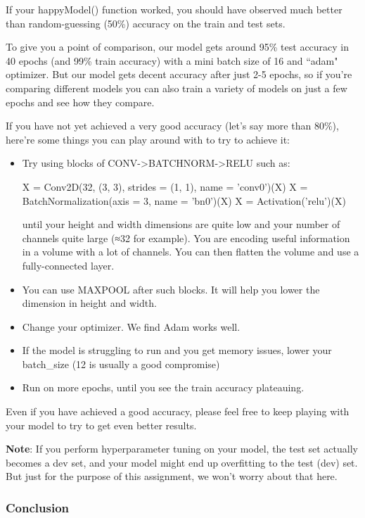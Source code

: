If your happyModel() function worked, you should have observed much better than random-guessing (50\%) accuracy on the train and test sets.

To give you a point of comparison, our model gets around 95\% test accuracy in 40 epochs (and 99\% train accuracy) with a mini batch size of 16 and ``adam" optimizer. But our model gets decent accuracy after just 2-5 epochs, so if you're comparing different models you can also train a variety of models on just a few epochs and see how they compare.

If you have not yet achieved a very good accuracy (let's say more than 80\%), here're some things you can play around with to try to achieve it:
\begin{itemize}
\item Try using blocks of CONV->BATCHNORM->RELU such as:
\begin{mypython}
X = Conv2D(32, (3, 3), strides = (1, 1), name = 'conv0')(X)
X = BatchNormalization(axis = 3, name = 'bn0')(X)
X = Activation('relu')(X)
\end{mypython}
until your height and width dimensions are quite low and your number of channels quite large (≈32 for example). You are encoding useful information in a volume with a lot of channels. You can then flatten the volume and use a fully-connected layer.
\item You can use MAXPOOL after such blocks. It will help you lower the dimension in height and width.
\item Change your optimizer. We find Adam works well.
\item If the model is struggling to run and you get memory issues, lower your batch\_size (12 is usually a good compromise)
\item Run on more epochs, until you see the train accuracy plateauing.
\end{itemize}


Even if you have achieved a good accuracy, please feel free to keep playing with your model to try to get even better results.

{\textbf {Note}}: If you perform hyperparameter tuning on your model, the test set actually becomes a dev set, and your model might end up overfitting to the test (dev) set. But just for the purpose of this assignment, we won't worry about that here.



\subsubsection{Conclusion}

